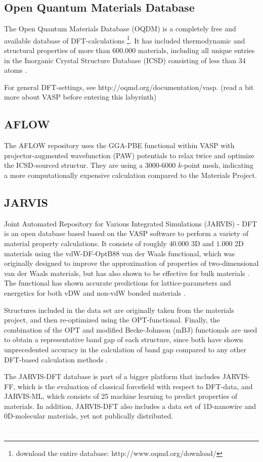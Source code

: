 \subsection{Open Quantum Materials Database}

The Open Quantum Materials Database (OQDM) is a completely free and available database of DFT-calculations \footnote{download the entire database:  http://www.oqmd.org/download/}. It has included thermodynamic and structural properties of more than $600.000$ materials, including all unique entries in the Inorganic Crystal Structure Database (ICSD) consisting of less than $34$ atoms \cite{Kirklin2015}.

For general DFT-settings, see http://oqmd.org/documentation/vasp. (read a bit more about VASP before entering this labyrinth)

\subsection{AFLOW}

The AFLOW repository uses the GGA-PBE functional within VASP with projector-augmented wavefunction (PAW) potentials to relax twice and optimize the ICSD-sourced structur. They are using a 3000-6000 $k$-point mesh, indicating a more computationally expensive calculation compared to the Materials Project. 


\subsection{JARVIS}

Joint Automated Repository for Various Integrated Simulations (JARVIS) - DFT is an open database based based on the VASP software to perform a variety of material property calculations. It consists of roughly $40.000$ 3D and $1.000$ 2D materials using the vdW-DF-OptB88 van der Waals functional, which was originally designed to improve the approximation of properties of two-dimensional van der Waals materials, but has also shown to be effective for bulk materials \cite{Thonhauser2007, Klimes2011}. The functional has shown accurate predictions for lattice-parameters and energetics for both vDW and non-vdW bonded materials  \cite{Choudhary2018}.

Structures included in the data set are originally taken from the materials project, and then re-optimized using the OPT-functional. Finally, the combination of the OPT and modified Becke-Johnson (mBJ) functionals are used to obtain a representative band gap of each structure, since both have shown unprecedented accuracy in the calculation of band gap compared to any other DFT-based calculation methods \cite{Choudhary2018a}.


The JARVIS-DFT database is part of a bigger platform that includes JARVIS-FF, which is the evaluation of classical forcefield with respect to DFT-data, and JARVIS-ML, which consists of 25 machine learning to predict properties of materials. In addition, JARVIS-DFT also includes a data set of 1D-nanowire and 0D-molecular materials, yet not publically distributed.

\section{}
